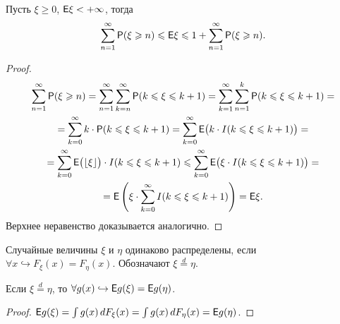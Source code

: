 \begin{lemma}
	Пусть $\xi \geqslant 0$, $\mathsf{E} \xi < + \infty$, тогда 
	$$ \sum\limits_{n=1}^\infty \mathsf{P} (\xi \geqslant n) \leqslant \mathsf{E} \xi \leqslant 1 + \sum\limits_{n = 1}^\infty \mathsf{P} ( \xi \geqslant n).$$
	\begin{proof}
		\begin{multline*}
			\sum\limits_{n = 1}^\infty \mathsf{P} ( \xi \geqslant n) = 
			\sum\limits_{n = 1}^\infty \sum\limits_{k = n}^\infty \mathsf{P} (k \leqslant \xi \leqslant k + 1) = 
			\sum\limits_{k =1}^\infty \sum\limits_{n = 1}^{k} \mathsf{P}( k \leqslant \xi \leqslant k + 1) = \\ = 
			\sum\limits_{k = 0}^{\infty} k \cdot \mathsf{P} ( k \leqslant \xi \leqslant k + 1) = 
			\sum\limits_{k = 0}^\infty \mathsf{E} \big( k \cdot I (k \leqslant \xi  \leqslant k + 1) \big) = \\ = 
			\sum\limits_{k = 0}^\infty \mathsf{E} \big( \lfloor \xi \rfloor \big) \cdot I (k \leqslant \xi \leqslant k + 1 ) \leqslant
			\sum\limits_{k = 0}^\infty \mathsf{E} \big( \xi \cdot I ( k \leqslant \xi \leqslant k+ 1) \big) = \\ =
			\mathsf{E} \left( \xi \cdot \sum\limits_{k = 0}^\infty I (k \leqslant \xi \leqslant k + 1) \right) = \mathsf{E} \xi.
		\end{multline*}
		Верхнее неравенство доказывается аналогично.
	\end{proof}
\end{lemma}

\begin{definition}
	Случайные величины $\xi $ и $\eta$ одинаково распределены, если  $\forall x \hookrightarrow F_\xi (x) = F_\eta(x)$. Обозначают $\xi \overset{d}{=} \eta$.
\end{definition}

\begin{statement}
Если $\xi \overset{d}{=} \eta$, то $\forall g(x) \hookrightarrow \mathsf{E} g(\xi) = \mathsf{E} g(\eta)$.
\begin{proof}
	$\mathsf{E} g(\xi) = \int g(x) \, d F_\xi(x) = \int g(x) \, d F_\eta(x) = \mathsf{E} g(\eta)$.
\end{proof}	
\end{statement}


